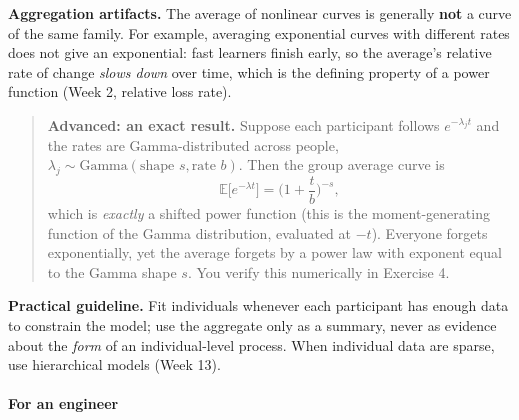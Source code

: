\textbf{Aggregation artifacts.} The average of nonlinear curves is
generally \textbf{not} a curve of the same family. For example,
averaging exponential curves with different rates does not give an
exponential: fast learners finish early, so the average's relative rate
of change \emph{slows down} over time, which is the defining property of
a power function (Week 2, relative loss rate).

\begin{quote}
\textbf{Advanced: an exact result.} Suppose each participant follows
\(e^{-\lambda_j t}\) and the rates are Gamma-distributed across people,
\(\lambda_j \sim \mathrm{Gamma}(\text{shape } s, \text{rate } b)\). Then
the group average curve is
\[\mathbb{E}\big[e^{-\lambda t}\big] = \Big(1 + \frac{t}{b}\Big)^{-s},\]
which is \emph{exactly} a shifted power function (this is the
moment-generating function of the Gamma distribution, evaluated at
\(-t\)). Everyone forgets exponentially, yet the average forgets by a
power law with exponent equal to the Gamma shape \(s\). You verify this
numerically in Exercise 4.
\end{quote}

\textbf{Practical guideline.} Fit individuals whenever each participant
has enough data to constrain the model; use the aggregate only as a
summary, never as evidence about the \emph{form} of an individual-level
process. When individual data are sparse, use hierarchical models (Week
13).

\paragraph{For an engineer}

